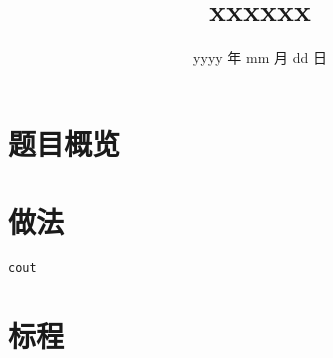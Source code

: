 \documentclass{ctsol}
\title{xxxxxx}
\date{yyyy 年 mm 月 dd 日}
\begin{document}
\maketitle
{}

\section*{题目概览}

\solutiontab

\makesolution
\section*{做法}

\verb|cout|

\section*{标程}

\end{document}
